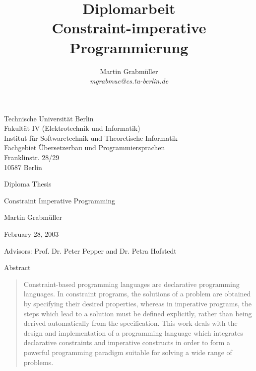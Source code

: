 \documentclass[a4paper,12pt,oneside]{book}
\title{Diplomarbeit\\
Constraint-imperative Programmierung}
\author{Martin Grabm\"uller\\
\normalsize{\em mgrabmue@cs.tu-berlin.de}}
\begin{document}



\cleardoublepage



\thispagestyle{empty}


\noindent
Technische Universit\"at Berlin\\
Fakult\"at IV (Elektrotechnik und Informatik)\\
Institut f\"ur Softwaretechnik und Theoretische Informatik\\
Fachgebiet \"Ubersetzerbau und Programmiersprachen\\
Franklinstr. 28/29\\
10587 Berlin

\vskip3cm

\begin{center}
{\Large Diploma Thesis

\vskip1cm

{\huge \sf Constraint Imperative Programming}

\vskip1cm

Martin Grabm\"uller

\vskip0.5cm

February 28, 2003

\vskip2cm

Advisors: Prof. Dr. Peter Pepper and Dr. Petra Hofstedt
}

\end{center}

\cleardoublepage

\begin{center}{\large Abstract}\end{center}
\begin{quote}
  Constraint-based programming languages are declarative programming
  languages.  In constraint programs, the solutions of a problem are
  obtained by specifying their desired properties, whereas in
  imperative programs, the steps which lead to a solution must be
  defined explicitly, rather than being derived automatically from the
  specification.  This work deals with the design and implementation
  of a programming language which integrates declarative constraints
  and imperative constructs in order to form a powerful programming
  paradigm suitable for solving a wide range of problems.
\end{quote}
\end{document}
